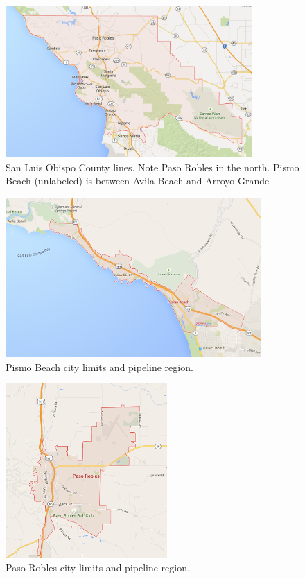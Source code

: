 \begin{figure}
    \centering
    \includegraphics[width=0.84\textwidth]{figures/county.png}
    \caption{San Luis Obispo County lines. Note Paso Robles in the north. Pismo Beach (unlabeled) is between Avila Beach and Arroyo Grande}
    \label{fig:county}
\end{figure}

\begin{figure}
    \centering
    \includegraphics[width=0.87\textwidth]{figures/pismo.png}
    \caption{Pismo Beach city limits and pipeline region.}
    \label{fig:pismo}
\end{figure}

\begin{figure}
    \centering
    \includegraphics[width=0.55\textwidth]{figures/paso.png}
    \caption{Paso Robles city limits and pipeline region.}
    \label{fig:paso}
\end{figure}

